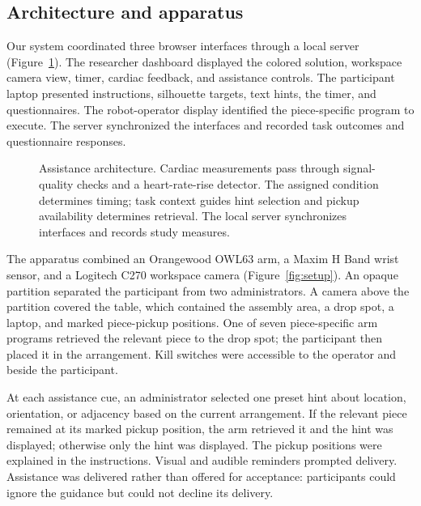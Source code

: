 \documentclass[sigconf,anonymous]{aamas}
\begin{document}
\subsection{Architecture and apparatus}

Our system coordinated three browser interfaces through a local server (Figure~\ref{fig:architecture}). The researcher dashboard displayed the colored solution, workspace camera view, timer, cardiac feedback, and assistance controls. The participant laptop presented instructions, silhouette targets, text hints, the timer, and questionnaires. The robot-operator display identified the piece-specific program to execute. The server synchronized the interfaces and recorded task outcomes and questionnaire responses.

\begin{figure}[t]
\centering
\begingroup
\renewcommand{\footnotesize}{\fontsize{10}{11}\selectfont}
\renewcommand{\scriptsize}{\fontsize{8.5}{9.5}\selectfont}
\renewcommand{\small}{\fontsize{10}{11}\selectfont}
\resizebox{.86\textwidth}{!}{}
\endgroup
\caption{Assistance architecture. Cardiac measurements pass through signal-quality checks and a heart-rate-rise detector. The assigned condition determines timing; task context guides hint selection and pickup availability determines retrieval. The local server synchronizes interfaces and records study measures.}
\label{fig:architecture}
\end{figure}

The apparatus combined an Orangewood OWL63 arm, a Maxim H Band wrist sensor, and a Logitech C270 workspace camera (Figure~\ref{fig:setup}). An opaque partition separated the participant from two administrators. A camera above the partition covered the table, which contained the assembly area, a drop spot, a laptop, and marked piece-pickup positions. One of seven piece-specific arm programs retrieved the relevant piece to the drop spot; the participant then placed it in the arrangement. Kill switches were accessible to the operator and beside the participant.

At each assistance cue, an administrator selected one preset hint about location, orientation, or adjacency based on the current arrangement. If the relevant piece remained at its marked pickup position, the arm retrieved it and the hint was displayed; otherwise only the hint was displayed. The pickup positions were explained in the instructions. Visual and audible reminders prompted delivery. Assistance was delivered rather than offered for acceptance: participants could ignore the guidance but could not decline its delivery.
\end{document}

